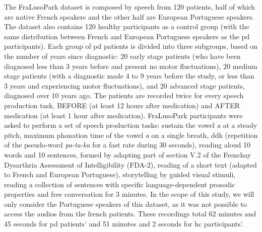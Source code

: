 The FraLusoPark dataset is composed by speech from 120 patients, half of which are native French speakers and the other half are European Portuguese speakers. The dataset also contains 120 healthy participants as a control group (with the same distribution between French and European Portuguese speakers as the \gls{pd} participants). Each group of \gls{pd} patients is divided into three subgroups, based on the number of years since diagnostic: 20 early stage patients (who have been diagnosed less than 3 years before and present no motor fluctuations), 20 medium stage patients (with a diagnostic made 4 to 9 years before the study, or less than 3 years and experiencing motor fluctuations), and 20 advanced stage patients, diagnosed over 10 years ago. The patients are recorded twice for every speech production task, BEFORE (at least 12 hours after medication) and AFTER medication (at least 1 hour after medication). FraLusoPark participants were asked to perform a set of speech production tasks: sustain the vowel \textit{\/a\/} at a steady pitch, maximum phonation time of the vowel \textit{\/a\/} on a single breath, \gls{ddk} (repetition of the pseudo-word \textit{\/pa-ta-ka\/} for a fast rate during 30 seconds), reading aloud 10 words and 10 sentences, formed by adapting part of section V.2 of the Frenchay Dysarthria Assessment of Intelligibility (FDA-2), reading of a short text (adapted to French and European Portuguese), storytelling by guided visual stimuli, reading a collection of sentences with specific language-dependent prosodic properties and free conversation for 3 minutes. In the scope of this study, we will only consider the Portuguese speakers of this dataset, as it was not possible to access the audios from the french patients. These recordings total 62 minutes and 45 seconds for \gls{pd} patients' and 51 minutes and 2 seconds for \gls{hc} participants'.

